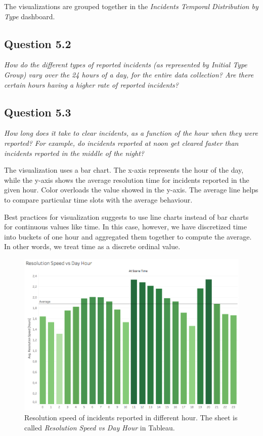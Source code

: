 The visualizations are grouped together in the \textit{Incidents Temporal Distribution by Type} dashboard.


\subsection*{Question 5.2}
\textit{How do the different types of reported incidents (as represented by Initial Type Group) vary over the 24 hours of a day, for the entire data collection? Are there certain hours having a higher rate of reported incidents?}


\subsection*{Question 5.3}
\textit{How long does it take to clear incidents, as a function of the hour when they were reported? For example, do incidents reported at noon get cleared faster than incidents reported in the middle of the night?}

The visualization uses a bar chart.
The x-axis represents the hour of the day, while the y-axis shows the average resolution time for incidents reported in the given hour.
Color overloads the value showed in the y-axis.
The average line helps to compare particular time slots with the average behaviour.

Best practices for visualization suggests to use line charts instead of bar charts for continuous values like time.
In this case, however, we have discretized time into buckets of one hour and aggregated them together to compute the average.
In other words, we treat time as a discrete ordinal value.

\begin{figure}[h]
	\centering
	\includegraphics[width=0.9\columnwidth]{figures/5_3_resolution_speed_vs_hour}
	\caption{Resolution speed of incidents reported in different hour. The sheet is called \textit{Resolution Speed vs Day Hour} in Tableau.}
	\label{fig:5_3_resolution_speed_vs_hour}
\end{figure}


